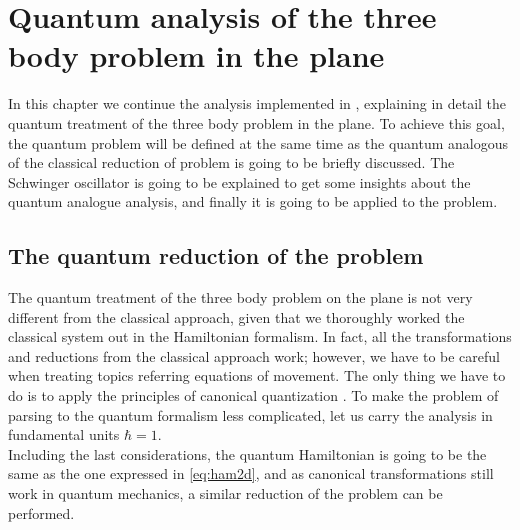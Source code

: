 \chapter{Quantum analysis of the three body problem in the plane}
In this chapter we continue the analysis implemented in \cite{alonso}, explaining in detail the quantum treatment of the three body problem in the plane. To achieve this goal, the quantum problem will be defined at the same time as the quantum analogous of the classical reduction of problem is going to be briefly discussed. The Schwinger oscillator is going to be explained to get some insights about the quantum analogue analysis, and finally it is going to be applied to the problem.\\

\section{The quantum reduction of the problem}
The quantum treatment of the three body problem on the plane is not very different from the classical approach, given that we thoroughly worked the classical system out in the Hamiltonian formalism. In fact, all the transformations and reductions from the classical approach work; however, we have to be careful when treating topics referring equations of movement.  The only thing we have to do is to apply the principles of canonical quantization \cite{Cq}. To make the problem of parsing to the quantum formalism less complicated, let us carry the analysis in fundamental units $\hbar =1$. \\

Including the last considerations, the quantum Hamiltonian is going to be the same as the one expressed in \eqref{eq:ham2d}, and as canonical transformations still work in quantum mechanics, a similar reduction of the problem can be performed.\\



